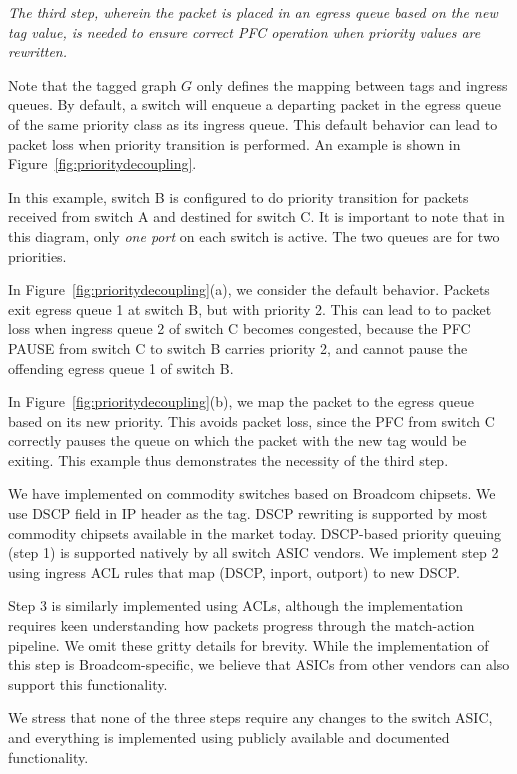 {\em The third step, wherein the packet is placed in an egress queue based on the
{\em new} tag value, is needed to ensure correct PFC operation when priority
values are rewritten.}

Note that the tagged graph $G$ only defines the mapping between tags and ingress
queues. By default, a switch will enqueue a departing packet in the egress queue
of the same priority class as its ingress queue. This default behavior can lead
to packet loss when priority transition is performed. An example is shown in
Figure~\ref{fig:prioritydecoupling}. 
 
In this example, switch B is configured to do priority transition for packets
received from switch A and destined for switch C. It is important to note that
in this diagram, only {\em one port} on each switch is active. The two queues
are for two priorities.
 
In Figure~\ref{fig:prioritydecoupling}(a), we consider the default behavior.
Packets exit egress queue 1 at switch B, but with priority 2.  This can lead to
to packet loss when ingress queue 2 of switch C becomes congested, because 
the PFC PAUSE from switch C to switch B carries priority 2, and cannot pause 
the offending egress queue 1 of switch B. 
 
In Figure~\ref{fig:prioritydecoupling}(b), we map the packet to the egress queue
based on its new priority.  This avoids packet loss, since the PFC from switch C
correctly pauses the queue on which the packet with the new tag would be
exiting. This example thus demonstrates the necessity of the third step.

We have implemented \sysname{} on commodity switches based on Broadcom chipsets.
We use DSCP field in IP header as the tag. DSCP rewriting is supported by most
commodity chipsets available in the market today. DSCP-based priority queuing
(step 1) is supported natively by all switch ASIC vendors. We implement step 2
using ingress ACL rules that map (DSCP, inport, outport) to new DSCP. 

Step 3 is similarly implemented using ACLs, although the implementation requires
keen understanding how packets progress through the match-action pipeline. We
omit these gritty details for brevity. While the implementation of this step is
Broadcom-specific, we believe that ASICs from other vendors can also support
this functionality.

We stress that none of the three steps require any changes to the switch ASIC,
and everything is implemented using publicly available and documented
functionality.

